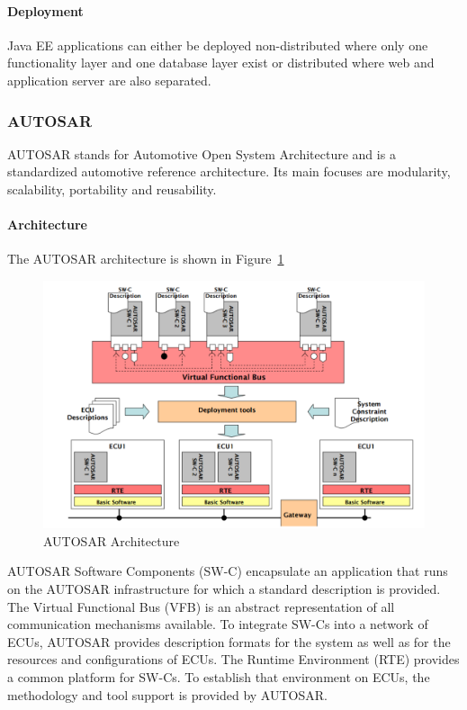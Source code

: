 \paragraph{Deployment}
Java EE applications can either be deployed non-distributed where only one functionality layer and one database layer exist or distributed where web and application server are also separated.

\subsubsection{AUTOSAR}
AUTOSAR stands for Automotive Open System Architecture and is a standardized automotive reference architecture.
Its main focuses are modularity, scalability, portability and reusability.

\paragraph{Architecture}
The AUTOSAR architecture is shown in Figure~\ref{fig:autosar}
\begin{figure}[h]
  \centering
  \includegraphics[width=.8\textwidth]{images/autosar.png}
  \caption{AUTOSAR Architecture}\label{fig:autosar}
\end{figure}
AUTOSAR Software Components (SW-C) encapsulate an application that runs on the AUTOSAR infrastructure for which a standard description is provided.
The Virtual Functional Bus (VFB) is an abstract representation of all communication mechanisms available.
To integrate SW-Cs into a network of ECUs, AUTOSAR provides description formats for the system as well as for the resources and configurations of ECUs.
The Runtime Environment (RTE) provides a common platform for SW-Cs.
To establish that environment on ECUs, the methodology and tool support is provided by AUTOSAR.\\

